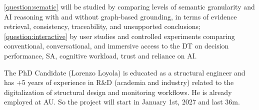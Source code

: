 \documentclass[12pt,a4paper]{article}
\begin{document}
\ref{question:sematic} will be studied by comparing levels of semantic granularity and AI reasoning with and without graph-based grounding, in terms of evidence retrieval, consistency, traceability, and unsupported conclusions; \ref{question:interactive} by user studies and controlled experiments comparing conventional, conversational, and immersive access to the DT on decision performance, SA, cognitive workload, trust and reliance on AI. \par
%
The PhD Candidate (Lorenzo Loyola) is educated as a structural engineer and has +5 years of experience in R\&D (academia and industry) related to the digitalization of structural design and monitoring workflows. He is already employed at AU. So the project will start in January 1st, 2027 and last 36m.
%
\end{document}
